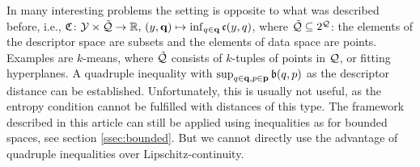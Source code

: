 \begin{itemize}
	In many interesting problems the setting is opposite to what was described before, i.e., $\mathfrak{C} \colon \mathcal{Y} \times \tilde{\mathcal{Q}} \to \mathbb{R} ,\, (y, \mathbf{q}) \mapsto \inf_{q\in\mathbf{q}} \mathfrak{c}(y,q)$, where $\tilde{\mathcal{Q}} \subseteq 2^{\mathcal{Q}}$: the elements of the descriptor space are subsets and the elements of data space are points. Examples are $k$-means, where $\tilde{\mathcal{Q}}$ consists of $k$-tuples of points in $\mathcal{Q}$, or fitting hyperplanes. A quadruple inequality with $\sup_{q\in\mathbf{q},p\in\mathbf{p}} \mathfrak{b}(q,p)$ as the descriptor distance can be established. Unfortunately, this is usually not useful, as the entropy condition cannot be fulfilled with distances of this type. The framework described in this article can still be applied using inequalities as for bounded spaces, see section \ref{ssec:bounded}. But we cannot directly use the advantage of quadruple inequalities over Lipschitz-continuity.
\end{itemize}
%
%
%
%
%
%
%
